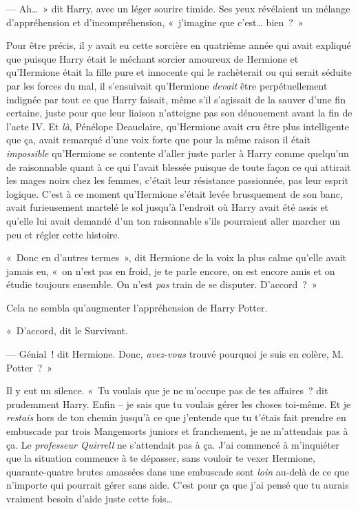 --- Ah…~» dit Harry, avec un léger sourire timide.
Ses yeux révélaient un mélange d'appréhension et d'incompréhension, «~j'imagine que c'est… bien~?~»

Pour être précis, il y avait eu cette sorcière en quatrième année qui avait expliqué que puisque Harry était le méchant sorcier amoureux de Hermione et qu'Hermione était la fille pure et innocente qui le rachèterait ou qui serait séduite par les forces du mal, il s'ensuivait qu'Hermione \emph{devait} être perpétuellement indignée par tout ce que Harry faisait, même s'il s'agissait de la sauver d'une fin certaine, juste pour que leur liaison n'atteigne pas son dénouement avant la fin de l'acte IV.
Et \emph{là}, Pénélope Deauclaire, qu'Hermione avait cru être plus intelligente que ça, avait remarqué d'une voix forte que pour la même raison il était \emph{impossible} qu'Hermione se contente d'aller juste parler à Harry comme quelqu'un de raisonnable quant à ce qui l'avait blessée puisque de toute façon ce qui attirait les mages noirs chez les femmes, c'était leur résistance passionnée, pas leur esprit logique.
C'est à ce moment qu'Hermione s'était levée brusquement de son banc, avait furieusement martelé le sol jusqu'à l'endroit où Harry avait été assis et qu'elle lui avait demandé d'un ton raisonnable s'ils pourraient aller marcher un peu et régler cette histoire.

«~Donc en d'autres termes~», dit Hermione de la voix la plus calme qu'elle avait jamais eu, «~on n'est pas en froid, je te parle encore, on est encore amis et on étudie toujours ensemble.
On n'est \emph{pas} train de se disputer.
D'accord~?~»

Cela ne sembla qu'augmenter l'appréhension de Harry Potter.

«~D'accord, dit le Survivant.

--- Génial~! dit Hermione.
Donc, \emph{avez-vous} trouvé pourquoi je suis en colère, M. Potter~?~»

Il y eut un silence.
«~Tu voulais que je ne m'occupe pas de tes affaires~? dit prudemment Harry.
Enfin -- je sais que tu voulais gérer les choses toi-même.
Et je \emph{restais} hors de ton chemin jusqu'à ce que j'entende que tu t'étais fait prendre en embuscade par trois Mangemorts juniors et franchement, je ne m'attendais pas à ça.
Le \emph{professeur Quirrell} ne s'attendait pas à ça.
J'ai commencé à m'inquiéter que la situation commence à te dépasser, sans vouloir te vexer Hermione, quarante-quatre brutes amassées dans une embuscade sont \emph{loin} au-delà de ce que n'importe qui pourrait gérer sans aide.
C'est pour ça que j'ai pensé que tu aurais vraiment besoin d'aide juste cette fois…

